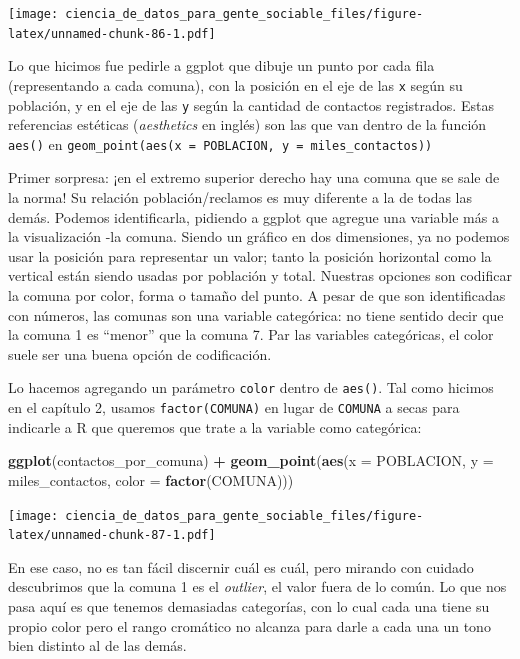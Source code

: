 \documentclass[spanish,]{book}
\newenvironment{Shaded}{\begin{snugshade}}{\end{snugshade}}
\newcommand{\DataTypeTok}[1]{\textcolor[rgb]{0.13,0.29,0.53}{#1}}
\newcommand{\KeywordTok}[1]{\textcolor[rgb]{0.13,0.29,0.53}{\textbf{#1}}}
\newcommand{\NormalTok}[1]{#1}
\newcommand{\OperatorTok}[1]{\textcolor[rgb]{0.81,0.36,0.00}{\textbf{#1}}}
\newcommand{\StringTok}[1]{\textcolor[rgb]{0.31,0.60,0.02}{#1}}
\begin{document}
\texttt{[image: ciencia\_de\_datos\_para\_gente\_sociable\_files/figure-latex/unnamed-chunk-86-1.pdf]}

Lo que hicimos fue pedirle a ggplot que dibuje un punto por cada fila (representando a cada comuna), con la posición en el eje de las \texttt{x} según su población, y en el eje de las \texttt{y} según la cantidad de contactos registrados. Estas referencias estéticas (\emph{aesthetics} en inglés) son las que van dentro de la función \texttt{aes()} en \texttt{geom\_point(aes(x\ =\ POBLACION,\ y\ =\ miles\_contactos))}

Primer sorpresa: ¡en el extremo superior derecho hay una comuna que se sale de la norma! Su relación población/reclamos es muy diferente a la de todas las demás. Podemos identificarla, pidiendo a ggplot que agregue una variable más a la visualización -la comuna. Siendo un gráfico en dos dimensiones, ya no podemos usar la posición para representar un valor; tanto la posición horizontal como la vertical están siendo usadas por población y total. Nuestras opciones son codificar la comuna por color, forma o tamaño del punto. A pesar de que son identificadas con números, las comunas son una variable categórica: no tiene sentido decir que la comuna 1 es ``menor'' que la comuna 7. Par las variables categóricas, el color suele ser una buena opción de codificación.

Lo hacemos agregando un parámetro \texttt{color} dentro de \texttt{aes()}. Tal como hicimos en el capítulo 2, usamos \texttt{factor(COMUNA)} en lugar de \texttt{COMUNA} a secas para indicarle a R que queremos que trate a la variable como categórica:

\begin{Shaded}
\begin{Highlighting}[]
\KeywordTok{ggplot}\NormalTok{(contactos_por_comuna) }\OperatorTok{+}\StringTok{ }
\StringTok{    }\KeywordTok{geom_point}\NormalTok{(}\KeywordTok{aes}\NormalTok{(}\DataTypeTok{x =}\NormalTok{ POBLACION, }\DataTypeTok{y =}\NormalTok{ miles_contactos, }\DataTypeTok{color =} \KeywordTok{factor}\NormalTok{(COMUNA)))}
\end{Highlighting}
\end{Shaded}

\texttt{[image: ciencia\_de\_datos\_para\_gente\_sociable\_files/figure-latex/unnamed-chunk-87-1.pdf]}

En ese caso, no es tan fácil discernir cuál es cuál, pero mirando con cuidado descubrimos que la comuna 1 es el \emph{outlier}, el valor fuera de lo común. Lo que nos pasa aquí es que tenemos demasiadas categorías, con lo cual cada una tiene su propio color pero el rango cromático no alcanza para darle a cada una un tono bien distinto al de las demás.
\end{document}
